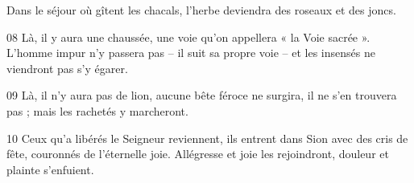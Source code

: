 Dans le séjour où gîtent les chacals, l’herbe deviendra des roseaux et des joncs.

08 Là, il y aura une chaussée, une voie qu’on appellera « la Voie sacrée ». L’homme impur n’y passera pas – il suit sa propre voie – et les insensés ne viendront pas s’y égarer.

09 Là, il n’y aura pas de lion, aucune bête féroce ne surgira, il ne s’en trouvera pas ; mais les rachetés y marcheront.

10 Ceux qu’a libérés le Seigneur reviennent, ils entrent dans Sion avec des cris de fête, couronnés de l’éternelle joie. Allégresse et joie les rejoindront, douleur et plainte s’enfuient.